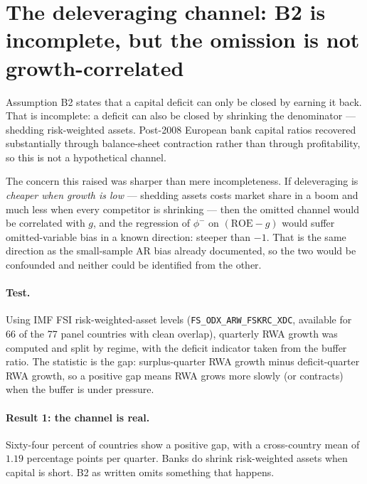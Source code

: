 \documentclass[11pt]{article}
\begin{document}
\section{The deleveraging channel: B2 is incomplete, but the omission is
not growth-correlated}
\label{sec:deleveraging}

Assumption B2 states that a capital deficit can only be closed by earning
it back. That is incomplete: a deficit can also be closed by shrinking the
denominator --- shedding risk-weighted assets. Post-2008 European bank
capital ratios recovered substantially through balance-sheet contraction
rather than through profitability, so this is not a hypothetical channel.

The concern this raised was sharper than mere incompleteness. If
deleveraging is \emph{cheaper when growth is low} --- shedding assets costs
market share in a boom and much less when every competitor is shrinking
--- then the omitted channel would be correlated with $g$, and the
regression of $\phi^-$ on $(\mathrm{ROE}-g)$ would suffer omitted-variable
bias in a known direction: steeper than $-1$. That is the same direction as
the small-sample AR bias already documented, so the two would be
confounded and neither could be identified from the other.

\paragraph{Test.} Using IMF FSI risk-weighted-asset levels
(\texttt{FS\_ODX\_ARW\_FSKRC\_XDC}, available for 66 of the 77 panel
countries with clean overlap), quarterly RWA growth was computed and split
by regime, with the deficit indicator taken from the buffer ratio. The
statistic is the gap: surplus-quarter RWA growth minus deficit-quarter RWA
growth, so a positive gap means RWA grows more slowly (or contracts) when
the buffer is under pressure.

\paragraph{Result 1: the channel is real.} Sixty-four percent of countries
show a positive gap, with a cross-country mean of $1.19$ percentage points
per quarter. Banks do shrink risk-weighted assets when capital is short.
B2 as written omits something that happens.
\end{document}
